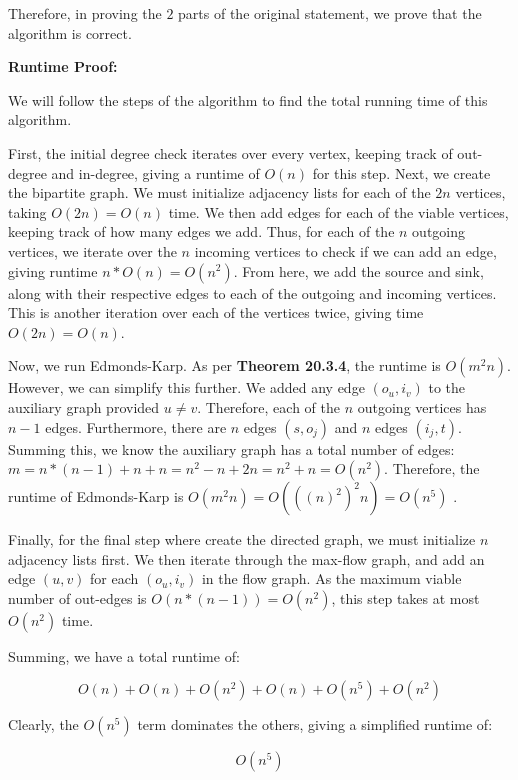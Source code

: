 \documentclass[11pt]{article}
\begin{document}
\begin{enumerate}
\medbreak

Therefore, in proving the $2$ parts of the original statement, we prove that the algorithm is correct.

\bigbreak

\textbf{Runtime Proof:}

We will follow the steps of the algorithm to find the total running time of this algorithm. 

First, the initial degree check iterates over every vertex, keeping track of out-degree and in-degree, giving a runtime of $O(n)$ for this step. 
Next, we create the bipartite graph. We must initialize adjacency lists for each of the $2n$ vertices, taking $O(2n) = O(n)$ time.  
We then add edges for each of the viable vertices, keeping track of how many edges we add. Thus, for each of the $n$ outgoing vertices, 
we iterate over the $n$ incoming vertices to check if we can add an edge, giving runtime $n * O(n) = O(n^2)$. 
From here, we add the source and sink, along with their respective edges to each of the outgoing and incoming vertices. 
This is another iteration over each of the vertices twice, giving time $O(2n) = O(n)$. 

Now, we run Edmonds-Karp. As per \textbf{Theorem 20.3.4}, the runtime is $O(m^{2}n)$. However, we can simplify this further. 
We added any edge $(o_u, i_v)$ to the auxiliary graph provided $u \neq v$. Therefore, each of the $n$ outgoing vertices has $n-1$ edges. 
Furthermore, there are $n$ edges $(s, o_j)$ and $n$ edges $(i_j, t)$. Summing this, we know the auxiliary graph has a total number of edges: 
$m = n * (n-1) + n + n = n^2 - n + 2n = n^2 + n = O(n^2)$. Therefore, the runtime of Edmonds-Karp is $O(m^{2}n) = O(((n)^{2})^{2}n) = O(n^5)$ . 

Finally, for the final step where create the directed graph, we must initialize $n$ adjacency lists first. 
We then iterate through the max-flow graph, and add an edge $(u, v)$ for each $(o_u, i_v)$ in the flow graph. 
As the maximum viable number of out-edges is $O(n * (n-1)) = O(n^2)$, this step takes at most $O(n^2)$ time. 

Summing, we have a total runtime of:

$$O(n) + O(n) + O(n^2) + O(n) + O(n^5) + O(n^2)$$

Clearly, the $O(n^5)$ term dominates the others, giving a simplified runtime of:

$$O(n^5)$$

\end{enumerate}
\end{document}
